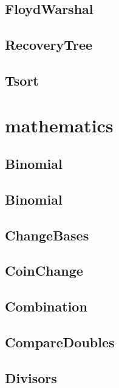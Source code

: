 \subsection{ FloydWarshal}
\raggedbottom
\hrulefill
\subsection{ RecoveryTree}
\raggedbottom
\hrulefill
\subsection{ Tsort}
\raggedbottom
\hrulefill

\section{mathematics}
\subsection{ Binomial}
\raggedbottom
\hrulefill
\subsection{ Binomial}
\raggedbottom
\hrulefill
\subsection{ ChangeBases}
\raggedbottom
\hrulefill
\subsection{ CoinChange}
\raggedbottom
\hrulefill
\subsection{ Combination}
\raggedbottom
\hrulefill
\subsection{ CompareDoubles}
\raggedbottom
\hrulefill
\subsection{ Divisors}
\raggedbottom
\hrulefill

